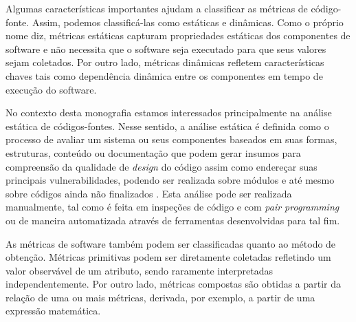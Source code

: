 %

Algumas características importantes ajudam a classificar as métricas de código-fonte. Assim, podemos classificá-las como estáticas e dinâmicas. Como o próprio nome diz, métricas estáticas capturam propriedades estáticas dos componentes de software e não necessita que o software seja executado para que seus valores sejam coletados. Por outro lado, métricas dinâmicas refletem características chaves tais como dependência dinâmica entre os componentes em tempo de execução do software.

%

No contexto desta monografia estamos interessados principalmente na análise estática de códigos-fontes. Nesse sentido, a análise estática é definida como o processo de avaliar um sistema ou seus componentes baseados em suas formas, estruturas, conteúdo ou documentação que podem gerar insumos para compreensão da qualidade de \emph{design} do código assim como endereçar suas principais vulnerabilidades, podendo ser realizada sobre módulos e até mesmo sobre códigos ainda não finalizados \cite{black2009}. Esta análise pode ser realizada manualmente, tal como é feita em inspeções de código e com \emph{pair programming} ou de maneira automatizada através de ferramentas desenvolvidas para tal fim.

%

As métricas de software também podem ser classificadas quanto ao método de obtenção. Métricas primitivas podem ser diretamente coletadas refletindo um valor observável de um atributo, sendo raramente interpretadas independentemente. Por outro lado, métricas compostas são obtidas a partir da relação de uma ou mais métricas, derivada, por exemplo, a partir de uma expressão matemática.

%

